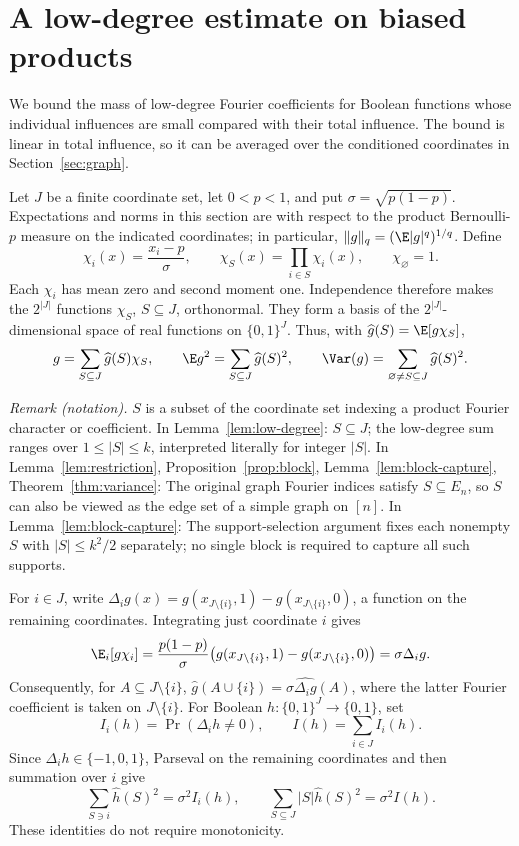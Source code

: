 \section{A low-degree estimate on biased products}\label{sec:fourier}

We bound the mass of low-degree Fourier coefficients for Boolean
functions whose individual influences are small compared with their
total influence. The bound is linear in total influence, so it can be
averaged over the conditioned coordinates in Section~\ref{sec:graph}.

Let $J$ be a finite coordinate set, let $0<p<1$, and put
$\sigma=\sqrt{p(1-p)}$. Expectations and norms in this section are with
respect to the product Bernoulli-$p$ measure on the indicated coordinates;
in particular, $\|g\|_q=(\E|g|^q)^{1/q}$. Define
\[
  \chi_i(x)=\frac{x_i-p}{\sigma},\qquad
  \chi_S(x)=\prod_{i\in S}\chi_i(x),\qquad \chi_\varnothing=1.
\]
Each $\chi_i$ has mean zero and second moment one. Independence therefore
makes the $2^{|J|}$ functions $\chi_S$, $S\subseteq J$, orthonormal.
They form a basis of the $2^{|J|}$-dimensional space of real functions on
$\{0,1\}^J$. Thus, with $\widehat g(S)=\E[g\chi_S]$,
\begin{equation}\label{eq:parseval}
  g=\sum_{S\subseteq J}\widehat g(S)\chi_S,\qquad
  \E g^2=\sum_{S\subseteq J}\widehat g(S)^2,\qquad
  \Var(g)=\sum_{\varnothing\ne S\subseteq J}\widehat g(S)^2.
\end{equation}

\noindent\textit{Remark (notation).} $S$ is a subset of the coordinate set indexing a product Fourier character or coefficient. In Lemma~\ref{lem:low-degree}: $S\subseteq J$; the low-degree sum ranges over $1\le |S|\le k$, interpreted literally for integer $|S|$. In Lemma~\ref{lem:restriction}, Proposition~\ref{prop:block}, Lemma~\ref{lem:block-capture}, Theorem~\ref{thm:variance}: The original graph Fourier indices satisfy $S\subseteq E_n$, so $S$ can also be viewed as the edge set of a simple graph on $[n]$. In Lemma~\ref{lem:block-capture}: The support-selection argument fixes each nonempty $S$ with $|S|\le k^2/2$ separately; no single block is required to capture all such supports.


For $i\in J$, write
$\Delta_i g(x)=g(x_{J\setminus\{i\}},1)-g(x_{J\setminus\{i\}},0)$,
a function on the remaining coordinates. Integrating just coordinate $i$
gives
\[
  \E_i[g\chi_i]
  =\frac{p(1-p)}{\sigma}
    \bigl(g(x_{J\setminus\{i\}},1)-g(x_{J\setminus\{i\}},0)\bigr)
  =\sigma\Delta_i g.
\]
Consequently, for $A\subseteq J\setminus\{i\}$,
$\widehat g(A\cup\{i\})=\sigma\widehat{\Delta_i g}(A)$,
where the latter Fourier coefficient is taken on $J\setminus\{i\}$.
For Boolean $h:\{0,1\}^J\to\{0,1\}$, set
\[
  I_i(h)=\Pr(\Delta_i h\ne0),\qquad I(h)=\sum_{i\in J}I_i(h).
\]
Since $\Delta_i h\in\{-1,0,1\}$, Parseval on the remaining coordinates
and then summation over $i$ give
\begin{equation}\label{eq:dirichlet}
  \sum_{S\ni i}\widehat h(S)^2=\sigma^2 I_i(h),\qquad
  \sum_{S\subseteq J}|S|\widehat h(S)^2=\sigma^2 I(h).
\end{equation}
These identities do not require monotonicity.

